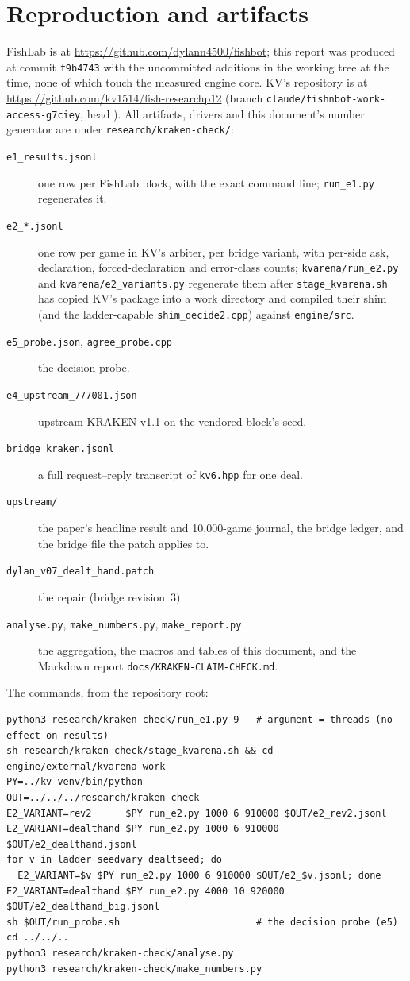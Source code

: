 \documentclass[11pt]{article}
\newcommand{\code}[1]{\texttt{#1}}
\begin{document}
\appendix

\section{Reproduction and artifacts}

FishLab is at \url{https://github.com/dylann4500/fishbot}; this report was produced at commit
\code{f9b4743} with the uncommitted additions in the working tree at the time, none of which touch the
measured engine core. KV's repository is at
\url{https://github.com/kv1514/fish-researchp12}
(branch \code{claude/fishnbot-work-access-g7ciey}, head \code{\kcUpstreamHead}). All artifacts, drivers and this document's number generator are under
\code{research/kraken-check/}:
\begin{description}
\item[\code{e1\_results.jsonl}] one row per FishLab block, with the exact command line;
      \code{run\_e1.py} regenerates it.
\item[\code{e2\_*.jsonl}] one row per game in KV's arbiter, per bridge variant, with per-side ask,
      declaration, forced-declaration and error-class counts; \code{kvarena/run\_e2.py} and
      \code{kvarena/e2\_variants.py} regenerate them after \code{stage\_kvarena.sh} has copied KV's
      package into a work directory and compiled their shim (and the ladder-capable
      \code{shim\_decide2.cpp}) against \code{engine/src}.
\item[\code{e5\_probe.json}, \code{agree\_probe.cpp}] the decision probe.
\item[\code{e4\_upstream\_777001.json}] upstream KRAKEN v1.1 on the vendored block's seed.
\item[\code{bridge\_kraken.jsonl}] a full request--reply transcript of \code{kv6.hpp} for one deal.
\item[\code{upstream/}] the paper's headline result and 10,000-game journal, the bridge ledger, and
      the bridge file the patch applies to.
\item[\code{dylan\_v07\_dealt\_hand.patch}] the repair (bridge revision~3).
\item[\code{analyse.py}, \code{make\_numbers.py}, \code{make\_report.py}] the aggregation, the
      macros and tables of this document, and the Markdown report \code{docs/KRAKEN-CLAIM-CHECK.md}.
\end{description}
The commands, from the repository root:
\begin{lstlisting}
python3 research/kraken-check/run_e1.py 9   # argument = threads (no effect on results)
sh research/kraken-check/stage_kvarena.sh && cd engine/external/kvarena-work
PY=../kv-venv/bin/python
OUT=../../../research/kraken-check
E2_VARIANT=rev2      $PY run_e2.py 1000 6 910000 $OUT/e2_rev2.jsonl
E2_VARIANT=dealthand $PY run_e2.py 1000 6 910000 $OUT/e2_dealthand.jsonl
for v in ladder seedvary dealtseed; do
  E2_VARIANT=$v $PY run_e2.py 1000 6 910000 $OUT/e2_$v.jsonl; done
E2_VARIANT=dealthand $PY run_e2.py 4000 10 920000 $OUT/e2_dealthand_big.jsonl
sh $OUT/run_probe.sh                        # the decision probe (e5)
cd ../../..
python3 research/kraken-check/analyse.py
python3 research/kraken-check/make_numbers.py
\end{lstlisting}
\end{document}
